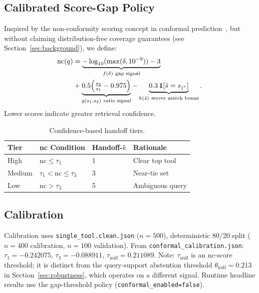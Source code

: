 \documentclass[sigconf,anonymous,review]{acmart}
\begin{document}
\subsection{Calibrated Score-Gap Policy}
Inspired by the non-conformity scoring concept in conformal
prediction~\cite{shafer2008tutorial}, but without claiming distribution-free
coverage guarantees (see Section~\ref{sec:background}), we define:
\begin{align}
\mathrm{nc}(q) &=
  \underbrace{-\log_{10}(\max(\delta,10^{-9}))-3}_{f(\delta)\ \text{gap signal}}
  \notag \\
  &+\underbrace{0.5\!\left(\tfrac{s_2}{s_1}-0.975\right)}_{g(s_1,s_2)\ \text{ratio signal}}
  -\underbrace{0.3\,\mathbf{1}[\hat{s}=s_{j^*}]}_{h(\hat{s})\ \text{server match bonus}}.
\label{eq:nc_score}
\end{align}
Lower scores indicate greater retrieval confidence.

\begin{table}[t]
\centering
\small
\caption{Confidence-based handoff tiers.}
\label{tab:tiers}
\begin{tabular}{@{}llll@{}}
\toprule
Tier   & nc Condition                    & Handoff-$k$ & Rationale \\
\midrule
High   & $\mathrm{nc}\le\tau_1$          & 1           & Clear top tool \\
Medium & $\tau_1<\mathrm{nc}\le\tau_3$   & 3           & Near-tie set \\
Low    & $\mathrm{nc}>\tau_3$            & 5           & Ambiguous query \\
\bottomrule
\end{tabular}
\end{table}

\subsection{Calibration}
Calibration uses \texttt{single\_tool.clean.json} ($n=500$), deterministic 80/20
split ($n=400$ calibration, $n=100$ validation).
From \texttt{conformal\_calibration.json}: $\tau_1=-0.242075$,
$\tau_3=-0.088911$, $\tau_{\mathrm{null}}=0.211089$.
Note: $\tau_{\mathrm{null}}$ is an nc-score threshold; it is distinct from the
query-support abstention threshold $\theta_{\mathrm{null}}=0.213$ in
Section~\ref{sec:robustness}, which operates on a different signal.
Runtime headline results use the gap-threshold policy
(\texttt{conformal\_enabled=false}).

\end{document}
